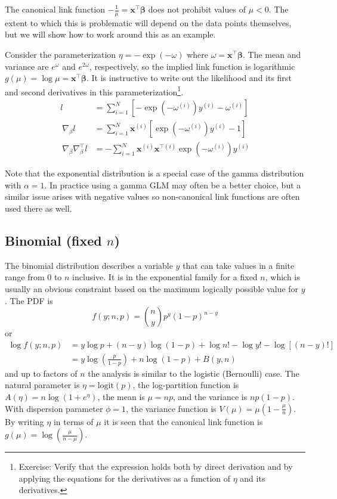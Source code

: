 \documentclass{article}
\newcommand{\bbeta}{\boldsymbol{\beta}}
\begin{document}
The canonical link function \(-\frac{1}{\mu} = \mathbf{x}^\intercal
\bbeta\) does not prohibit values of \(\mu < 0\). The extent to
which this is problematic will depend on the data points themselves, but we will
show how to work around this as an example.

Consider the parameterization \(\eta = -\exp(-\omega)\) where \(
\omega = \mathbf{x}^\intercal \bbeta\).
The mean and variance are \(e^{\omega}\) and \(e^{2\omega}\), respectively,
so the implied link function is logarithmic \(g(\mu) = \log \mu =
\mathbf{x}^\intercal \bbeta \).
It is instructive to write out the likelihood and its first and second
derivatives in this parameterization\footnote{
    Exercise: Verify that the expression holds both by direct derivation and by applying
    the equations for the derivatives as a function of \(\eta\) and its derivatives.
}.
\begin{align}
l &= \sum_{i=1}^N \left[ - \exp\left(-\omega^{(i)}\right) y^{(i)} - \omega^{(i)} \right]\\\
\nabla_{\beta} l &= \sum_{i=1}^N \mathbf{x}^{(i)} \left[ \exp\left(-\omega^{(i)}\right) y^{(i)} - 1 \right] \\\
\nabla_{\beta} \nabla^\intercal_{\beta} l &= - \sum_{i=1}^N \mathbf{x}^{(i)}
\mathbf{x}^{\intercal(i)} \exp\left(-\omega^{(i)}\right) y^{(i)}
\end{align}

Note that the exponential distribution is a special case of the gamma
distribution with \(\alpha = 1\). In practice using a gamma GLM may often be a
better choice, but a similar issue arises with negative values so non-canonical
link functions are often used there as well.

\subsection{Binomial (fixed \(n\))}

The binomial distribution describes a variable \(y\) that can take values in a
finite range from \(0\) to \(n\) inclusive. It is in the exponential family
for a fixed \(n\), which is usually an obvious constraint based on the maximum
logically possible value for \(y\). The PDF is
\[ f(y; n, p) =
\binom{n}{y} p^y (1-p)^{n-y}
\]
or
\begin{align}
\log f(y; n, p) &= y \log p + (n-y) \log(1-p) + \log n! - \log y! - \log[(n-y)!] \\\
&= y \log \left( \frac{p}{1-p} \right) + n \log(1-p) + B(y, n)
\end{align}
and up to factors of \(n\) the analysis is similar to the logistic (Bernoulli)
case.
The natural parameter is \(\eta = \textrm{logit}(p)\), the log-partition
function is \(A(\eta) = n \log(1 + e^\eta)\), the mean is \(\mu = np\), and
the variance is \(np(1-p)\). With dispersion parameter \(\phi = 1\), the
variance function is \(V(\mu) = \mu\left(1 - \frac{\mu}{n}\right)\).
By writing \(\eta\) in terms of \(\mu\) it is seen that the canonical link
function is \(g(\mu) = \log\left( \frac{\mu}{n - \mu}\right) \).
\end{document}
